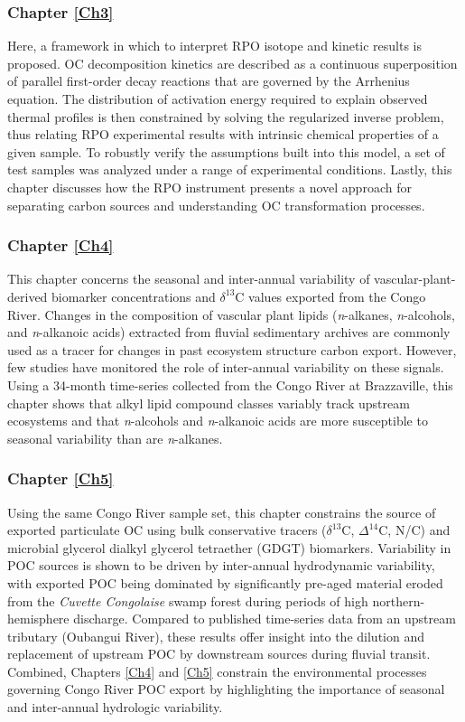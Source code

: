 \subsubsection{Chapter \ref{Ch3}}

Here, a framework in which to interpret RPO isotope and kinetic results is proposed. OC decomposition kinetics are described as a continuous superposition of parallel first-order decay reactions that are governed by the Arrhenius equation. The distribution of activation energy required to explain observed thermal profiles is then constrained by solving the regularized inverse problem, thus relating RPO experimental results with intrinsic chemical properties of a given sample. To robustly verify the assumptions built into this model, a set of test samples was analyzed under a range of experimental conditions. Lastly, this chapter discusses how the RPO instrument presents a novel approach for separating carbon sources and understanding OC transformation processes.

\subsubsection{Chapter \ref{Ch4}}

This chapter concerns the seasonal and inter-annual variability of vascular-plant-derived biomarker concentrations and $\delta^{13}$C values exported from the Congo River. Changes in the composition of vascular plant lipids (\textit{n}-alkanes, \textit{n}-alcohols, and \textit{n}-alkanoic acids) extracted from fluvial sedimentary archives are commonly used as a tracer for changes in past ecosystem structure carbon export. However, few studies have monitored the role of inter-annual variability on these signals. Using a 34-month time-series collected from the Congo River at Brazzaville, this chapter shows that alkyl lipid compound classes variably track upstream ecosystems and that \textit{n}-alcohols and \textit{n}-alkanoic acids are more susceptible to seasonal variability than are \textit{n}-alkanes. 

\subsubsection{Chapter \ref{Ch5}}

Using the same Congo River sample set, this chapter constrains the source of exported particulate OC using bulk conservative tracers ($\delta^{13}$C, $\Delta^{14}$C, N/C) and microbial glycerol dialkyl glycerol tetraether (GDGT) biomarkers. Variability in POC sources is shown to be driven by inter-annual hydrodynamic variability, with exported POC being dominated by significantly pre-aged material eroded from the \textit{Cuvette Congolaise} swamp forest during periods of high northern-hemisphere discharge. Compared to published time-series data from an upstream tributary (Oubangui River), these results offer insight into the dilution and replacement of upstream POC by downstream sources during fluvial transit. Combined, Chapters \ref{Ch4} and \ref{Ch5} constrain the environmental processes governing Congo River POC export by highlighting the importance of seasonal and inter-annual hydrologic variability.

